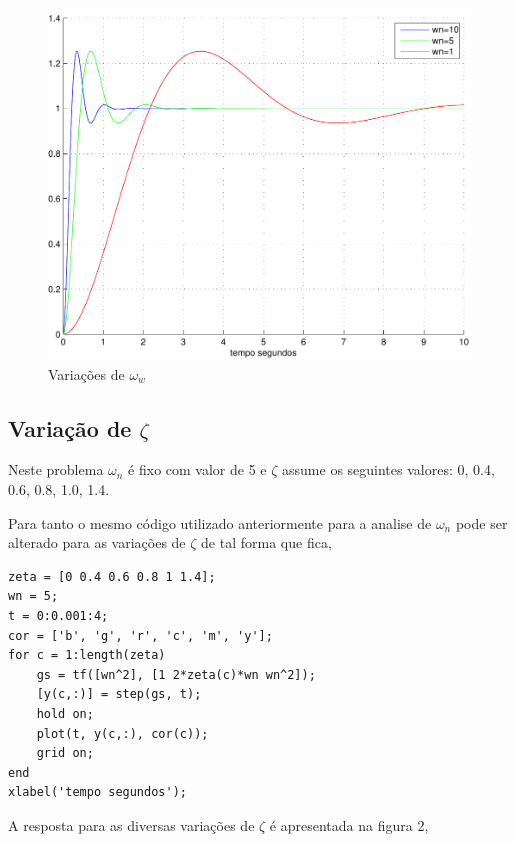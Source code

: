 \documentclass[paper=a4, fontsize=11pt]{article}
\begin{document}
\begin{figure}
    \begin{center}
    \includegraphics[scale=.5]{q1ia.pdf}
    \caption{Variações de $\omega_w$}
    \end{center}
\end{figure}

\subsection{Variação de $\zeta$}

Neste problema $\omega_n$ é fixo com valor de 5 e $\zeta$ assume os seguintes
valores: 0, 0.4, 0.6, 0.8, 1.0, 1.4.

Para tanto o mesmo código utilizado anteriormente para a analise de $\omega_n$
pode ser alterado para as variações de $\zeta$ de tal forma que fica,

\begin{lstlisting}
zeta = [0 0.4 0.6 0.8 1 1.4];
wn = 5;
t = 0:0.001:4;
cor = ['b', 'g', 'r', 'c', 'm', 'y'];
for c = 1:length(zeta)
    gs = tf([wn^2], [1 2*zeta(c)*wn wn^2]);
    [y(c,:)] = step(gs, t);
    hold on;
    plot(t, y(c,:), cor(c));
    grid on;
end
xlabel('tempo segundos');
\end{lstlisting}

A resposta para as diversas variações de $\zeta$ é apresentada na figura 2,
\end{document}
